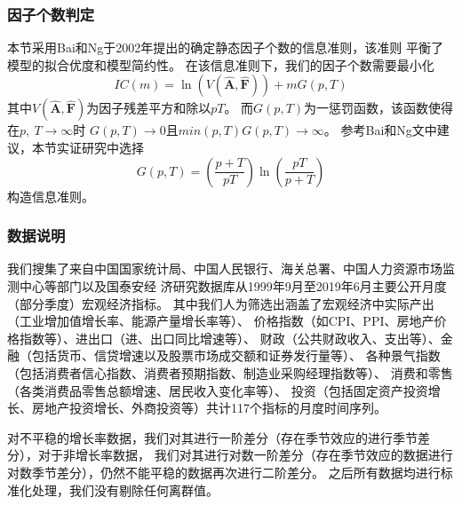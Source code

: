 \subsubsection{因子个数判定}
本节采用Bai和Ng于2002年提出的确定静态因子个数的信息准则，该准则
平衡了模型的拟合优度和模型简约性。
在该信息准则下，我们的因子个数需要最小化
\begin{equation*}
    IC(m) = \ln(V(\hat{\bm{A}}, \hat{\bm{F}})) + mG(p, T)
\end{equation*}
其中$V(\hat{\bm{A}}, \hat{\bm{F}})$为因子残差平方和除以$pT$。
而$G(p,T)$为一惩罚函数，该函数使得在$p,\ T \rightarrow \infty$时
$G(p, T) \rightarrow 0$且$min(p, T)G(p,T) \rightarrow \infty$。
参考Bai和Ng文中建议，本节实证研究中选择
$$
    G(p, T) = (\frac{p + T}{pT})\ln(\frac{pT}{p + T})
$$
构造信息准则。

\subsubsection{数据说明}
我们搜集了来自中国国家统计局、中国人民银行、海关总署、中国人力资源市场监测中心等部门以及国泰安经
济研究数据库从1999年9月至2019年6月主要公开月度（部分季度）宏观经济指标。
其中我们人为筛选出涵盖了宏观经济中实际产出（工业增加值增长率、能源产量增长率等）、
价格指数（如CPI、PPI、房地产价格指数等）、进出口（进、出口同比增速等）、
财政（公共财政收入、支出等）、金融（包括货币、信贷增速以及股票市场成交额和证券发行量等）、
各种景气指数（包括消费者信心指数、消费者预期指数、制造业采购经理指数等）、
消费和零售（各类消费品零售总额增速、居民收入变化率等）、
投资（包括固定资产投资增长、房地产投资增长、外商投资等）共计117个指标的月度时间序列。

对不平稳的增长率数据，我们对其进行一阶差分（存在季节效应的进行季节差分），对于非增长率数据，
我们对其进行对数一阶差分（存在季节效应的数据进行对数季节差分），仍然不能平稳的数据再次进行二阶差分。
之后所有数据均进行标准化处理，我们没有剔除任何离群值。

